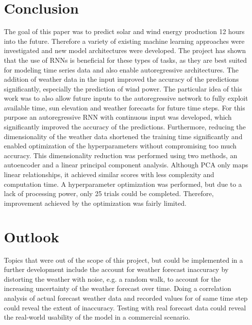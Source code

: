 \documentclass[11pt,table]{article}
\begin{document}
\section{Conclusion}
The goal of this paper was to predict solar and wind energy production 12 hours into the future. Therefore a variety of existing machine learning approaches were investigated and new model architectures were developed. 
The project has shown that the use of \acp{RNN} is beneficial for these types of tasks, as they are best suited for modeling time series data and also enable autoregressive architectures.
The addition of weather data in the input improved the accuracy of the predictions significantly, especially the prediction of wind power. The particular idea of this work was to also allow future inputs to the autoregressive network to fully exploit available time, sun elevation and weather forecasts for future time steps. For this purpose an autoregressive \ac{RNN} with continuous input was developed, which significantly improved the accuracy of the predictions.
Furthermore, reducing the dimensionality of the weather data shortened the training time significantly and enabled optimization of the hyperparameters without compromising too much accuracy.
This dimensionality reduction was performed using two methods, an autoencoder and a linear principal component analysis. 
Although \ac{PCA} only maps linear relationships, it achieved similar scores with less complexity and computation time.
A hyperparameter optimization was performed, but due to a lack of processing power, only 25 trials could be completed. Therefore, improvement achieved by the optimization was fairly limited.

\section{Outlook}
Topics that were out of the scope of this project, but could be implemented in a further development include the account for weather forecast inaccuracy by distorting the weather with noise, e.g. a random walk, to account for the increasing uncertainty of the weather forecast over time. Doing a correlation analysis of actual forecast weather data and recorded values for of same time step could reveal the extent of inaccuracy. Testing with real forecast data could reveal the real-world usability of the model in a commercial scenario.
\end{document}
